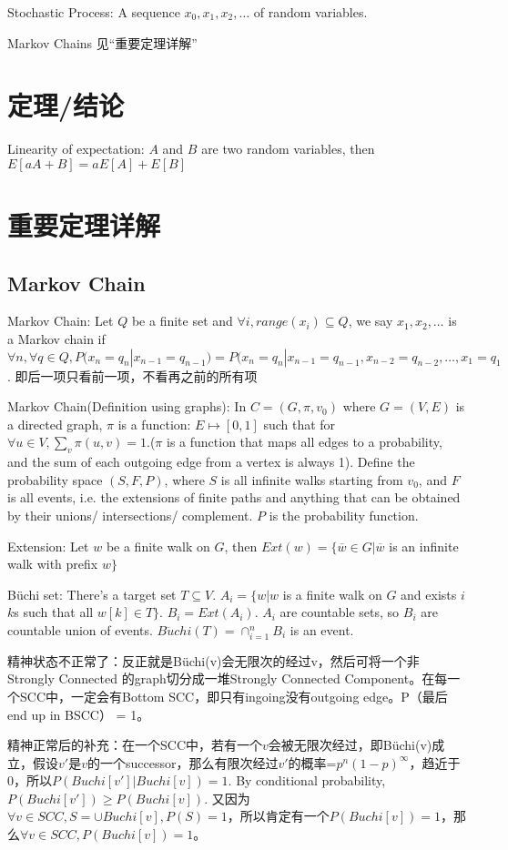 \documentclass[12pt,a4paper]{ctexrep}
\begin{document}
Stochastic Process: A sequence $x_0,x_1,x_2,\dots$ of random variables.

Markov Chains 见“重要定理详解”
\section{定理/结论}
Linearity of expectation: $A$ and $B$ are two random variables, then $E[aA+B] = aE[A]+E[B]$
\section{重要定理详解}
\subsection{Markov Chain}
Markov Chain: Let $Q$ be a finite set and $\forall i, range(x_i) \subseteq Q$, we say $x_1,x_2,\dots$ is a Markov chain if $\forall n, \forall q \in Q, P(x_n = q_n|x_{n-1} = q_{n-1}) = P(x_n = q_n|x_{n-1} = q_{n-1},x_{n-2} = q_{n-2},\dots,x_{1} = q_{1}$. 即后一项只看前一项，不看再之前的所有项

Markov Chain(Definition using graphs): In $C = (G,\pi,v_0)$ where $G = (V,E)$ is a directed graph, $\pi$ is a function: $E\mapsto [0,1]$ such that for $\forall u \in V, \sum_{v} \pi(u,v) = 1$.($\pi$ is a function that maps all edges to a probability, and the sum of each outgoing edge from a vertex is always 1). Define the probability space $(S,F,P)$, where $S$ is all infinite walks starting from $v_0$, and $F$ is all events, i.e. the extensions of finite paths and anything that can be obtained by their unions/ intersections/ complement. $P$ is the probability function.

Extension: Let $w$ be a finite walk on $G$, then $Ext(w) = \{\overline{w} \in G| \overline{w}$ is an infinite walk with prefix $w\}$

B\"uchi set: There's a target set $T\subseteq V$. $A_i = \{w|w$ is a finite walk on $G$ and exists $i$ $k$s such that all $w[k] \in T\}$. $B_i = Ext(A_i)$. $A_i$ are countable sets, so $B_i$ are countable union of events. $B\ddot{u}chi(T) = \cap_{i=1}^n B_i$ is an event.

精神状态不正常了：反正就是B\"uchi(v)会无限次的经过v，然后可将一个非Strongly Connected 的graph切分成一堆Strongly Connected Component。在每一个SCC中，一定会有Bottom SCC，即只有ingoing没有outgoing edge。P（最后end up in BSCC） = 1。%

精神正常后的补充：在一个SCC中，若有一个$v$会被无限次经过，即B\"uchi(v)成立，假设$v'$是$v$的一个successor，那么有限次经过$v'$的概率=$p^n(1-p)^{\infty}$，趋近于0，所以$P(Buchi[v']|Buchi[v])=1$. By conditional probability, $P(Buchi[v'])\geq P(Buchi[v])$. 又因为 $\forall v \in SCC, S=\cup Buchi[v], P(S)=1$，所以肯定有一个$P(Buchi[v])=1$，那么$\forall v \in SCC, P(Buchi[v])=1$。
\end{document}
